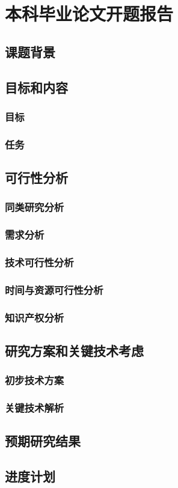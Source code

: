\chapter{本科毕业论文开题报告}
\section{课题背景}

\section{目标和内容}
\subsection{目标}

\subsection{任务}

\section{可行性分析}
\subsection{同类研究分析}

\subsection{需求分析}

\subsection{技术可行性分析}

\subsection{时间与资源可行性分析}

\subsection{知识产权分析}


\section{研究方案和关键技术考虑}

\subsection{初步技术方案}


\subsection{关键技术解析}



\section{预期研究结果}




\section{进度计划} 
